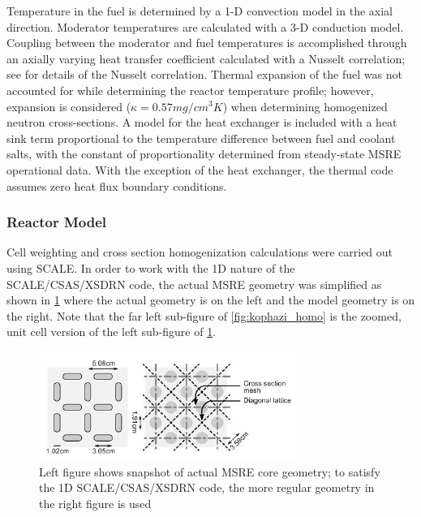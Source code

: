 \documentclass{article}
\let\Oldsubsubsection\subsubsection
\renewcommand{\subsubsection}{\FloatBarrier\Oldsubsubsection}
\begin{document}
Temperature in the fuel is determined by a 1-D convection model in the axial
direction. Moderator temperatures are calculated with a 3-D conduction
model. Coupling between the moderator and fuel temperatures is accomplished
through an axially varying heat transfer coefficient calculated with a Nusselt
correlation; see \cite{kophazi_development_????} for details of the Nusselt
correlation. Thermal expansion of the fuel was not accounted for while
determining the reactor temperature profile; however, expansion is considered
($\kappa = 0.57 mg/cm^3 K$) when determining homogenized neutron
cross-sections. A model for the heat exchanger is included with a heat sink term
proportional to the temperature difference between fuel and coolant salts, with
the constant of proportionality determined from steady-state \gls{MSRE} operational
data. With the exception of the heat exchanger, the thermal code assumes zero
heat flux boundary conditions.

\subsubsection{Reactor Model}

Cell weighting and cross section homogenization calculations were carried out
using SCALE. In order to work with the 1D nature of the SCALE/CSAS/XSDRN code,
the actual \gls{MSRE} geometry was simplified as shown in \cref{fig:real-vs-model}
where the actual geometry is on the left and the model geometry is on the
right. Note that the far left sub-figure of \cref{fig:kophazi_homo} is the
zoomed, unit cell version of the left sub-figure of \cref{fig:real-vs-model}.

\begin{figure}[htpb]
  \centering
  \includegraphics[max height=.5\textheight,max width=\textwidth,keepaspectratio]{kophazi-actual-vs-model-core-geometry.png}
  \caption{Left figure shows snapshot of actual \gls{MSRE} core geometry; to satisfy
    the 1D SCALE/CSAS/XSDRN code, the more regular geometry in the right figure
    is used \cite{kophazi_development_????}}
  \label{fig:real-vs-model}
\end{figure}
\end{document}
